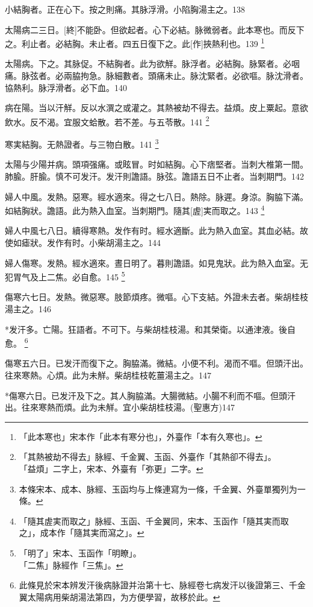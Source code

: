 \documentclass[12pt,twoside,UTF8,b5paper]{ctexbook}
\begin{document}
小結胸者。正在心下。按之則痛。其脉浮滑。小陷胸湯主之。138

太陽病二三日。[終]不能卧。但欲起者。心下必結。脉微弱者。此本寒也。而反下之。利止者。必結胸。未止者。四五日復下之。此[作]挾熱利也。139
	\footnote{「此本寒也」宋本作「此本有寒分也」，外臺作「本有久寒也」。}

太陽病。下之。其脉促。不結胸者。此为欲觧。脉浮者。必結胸。脉緊者。必咽痛。脉弦者。必兩脇拘急。脉細數者。頭痛未止。脉沈緊者。必欲嘔。脉沈滑者。協熱利。脉浮滑者。必下血。140

病在陽。当以汗觧。反以水潠之或灌之。其熱被劫不得去。益煩。皮上粟起。意欲飲水。反不渴。宜服文蛤散。若不差。与五苓散。141
	\footnote{「其熱被劫不得去」脉經、千金翼、玉函、外臺作「其熱卻不得去」。\\「益煩」二字上，宋本、外臺有「弥更」二字。}

寒実結胸。无熱證者。与三物白散。141
	\footnote{本條宋本、成本、脉經、玉函均与上條連寫为一條，千金翼、外臺單獨列为一條。}

太陽与少陽并病。頭項强痛。或眩冒。时如結胸。心下痞堅者。当刺大椎第一間。肺腧。肝腧。慎不可发汗。发汗則譫語。脉弦。譫語五日不止者。当刺期門。142

婦人中風。发熱。惡寒。經水適來。得之七八日。熱除。脉遲。身涼。胸脇下滿。如結胸狀。譫語。此为熱入血室。当刺期門。隨其[虗]実而取之。143
	\footnote{「隨其虗実而取之」脉經、玉函、千金翼同，宋本、玉函作「隨其実而取之」，成本作「隨其実而瀉之」。}

婦人中風七八日。續得寒熱。发作有时。經水適斷。此为熱入血室。其血必結。故使如瘧狀。发作有时。小柴胡湯主之。144

婦人傷寒。发熱。經水適來。晝日明了。暮則譫語。如見鬼狀。此为熱入血室。无犯胃气及上二焦。必自愈。145
	\footnote{「明了」宋本、玉函作「明瞭」。\\「二焦」脉經作「三焦」。}

傷寒六七日。发熱。微惡寒。肢節煩疼。微嘔。心下支結。外證未去者。柴胡桂枝湯主之。146

*发汗多。亡陽。狂語者。不可下。与柴胡桂枝湯。和其榮衛。以通津液。後自愈。
	\footnote{此條見於宋本辨发汗後病脉證并治第十七、脉經卷七病发汗以後證第三、千金翼太陽病用柴胡湯法第四，为方便學習，故移於此。}

傷寒五六日。已发汗而復下之。胸脇滿。微結。小便不利。渴而不嘔。但頭汗出。往來寒熱。心煩。此为未觧。柴胡桂枝乾薑湯主之。147

*傷寒六日。已发汗及下之。其人胸脇滿。大腸微結。小腸不利而不嘔。但頭汗出。往來寒熱而煩。此为未觧。宜小柴胡桂枝湯。(聖惠方)147
\end{document}
